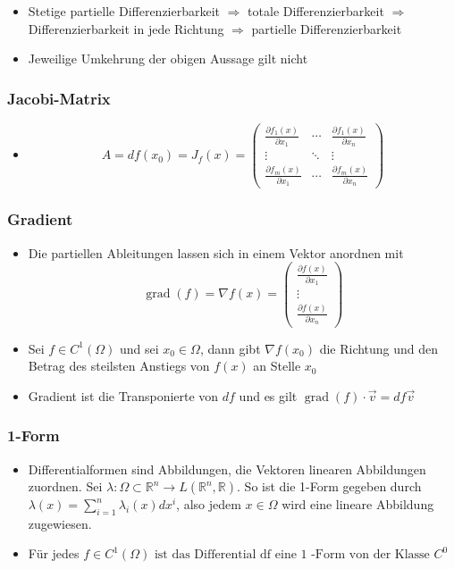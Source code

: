\documentclass[a3paper, 11pt, landscape]{scrartcl}
\DeclareMathOperator{\grad}{grad}
\begin{document}
\begin{multicols*}{3}
    \begin{itemize}
        \item Stetige partielle Differenzierbarkeit $\Rightarrow$ totale Differenzierbarkeit $\Rightarrow$ Differenzierbarkeit in jede Richtung $\Rightarrow$ partielle Differenzierbarkeit
        \item Jeweilige Umkehrung der obigen Aussage gilt nicht
    \end{itemize}
    
    \subsubsection{Jacobi-Matrix}
    \begin{itemize}
        \item $$A=df(x_0)=J_f(x)=
						\begin{pmatrix}
							\frac{\partial f_1(x)}{\partial x_1} &\cdots &\frac{\partial f_1(x)}{\partial x_n}\\
							\vdots &\ddots &\vdots\\
							\frac{\partial f_m(x)}{\partial x_1 } &\cdots &\frac{\partial f_m(x)}{\partial x_n}
						\end{pmatrix}$$
    \end{itemize}
    
    \subsubsection{Gradient}
	\begin{itemize}
	    \item Die partiellen Ableitungen lassen sich in einem Vektor anordnen mit $$\grad(f)=\nabla f(x)=
						\begin{pmatrix}
							\frac{\partial f(x)}{\partial x_1}\\
							\vdots\\
							\frac{\partial f(x)}{\partial x_n}
						\end{pmatrix}$$
		\item Sei $f\in C^1(\Omega)$ und sei $x_0\in\Omega$, dann gibt $\nabla f(x_0)$ die Richtung und den Betrag des steilsten Anstiegs von $f(x)$ an Stelle $x_0$
		\item Gradient ist die Transponierte von $df$ und es gilt $\grad(f)\cdot \vec{v}=df \vec{v}$
	\end{itemize}
	
	\subsubsection{1-Form}
	\begin{itemize}
	    \item Differentialformen sind Abbildungen, die Vektoren linearen Abbildungen zuordnen. Sei \(\lambda: \Omega \subset \mathbb{R}^{n} \rightarrow L\left(\mathbb{R}^{n}, \mathbb{R}\right) .\) So ist die 1-Form gegeben durch $\lambda(x)=\sum_{i=1}^{n} \lambda_{i}(x) d x^{i}$, also jedem $x\in\Omega$ wird eine lineare Abbildung zugewiesen.
	    \item Für jedes $f \in C^{1}(\Omega) \text { ist das Differential df eine } 1 \text { -Form von der Klasse } C^{0}$
	\end{itemize}
	

\end{multicols*}
\end{document}
